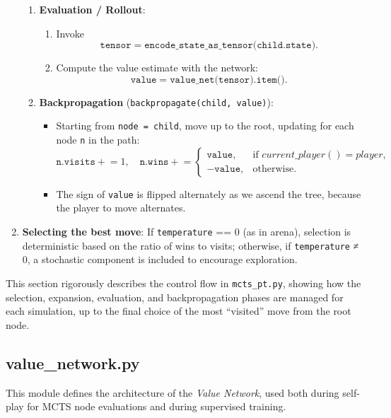 \documentclass{report}
\begin{document}
\begin{enumerate}
\begin{enumerate}
      \item \textbf{Evaluation / Rollout}:
            \begin{enumerate}
              \item Invoke  
                \[
                  \texttt{tensor} = \texttt{encode\_state\_as\_tensor(child.state)}.
                \]
             \item Compute the value estimate with the network:
                \[
                  \texttt{value} = \texttt{value\_net(tensor).item()}.
                \]
            \end{enumerate}

      \item \textbf{Backpropagation} (\texttt{backpropagate(child, value)}):
        \begin{itemize}
          \item Starting from \texttt{node = child}, move up to the root, updating for each node \texttt{n} in the path:
            \[
              \texttt{n.visits} \mathrel{+}= 1,
              \quad
              \texttt{n.wins} \mathrel{+}= 
              \begin{cases}
                \texttt{value}, & \text{if } current\_player() = player,\\
                -\texttt{value}, & \text{otherwise}.
              \end{cases}
            \]
          \item The sign of \texttt{value} is flipped alternately as we ascend the tree, because the player to move alternates.
        \end{itemize}
    \end{enumerate}

  \item \textbf{Selecting the best move}:
      If \texttt{temperature} == 0 (as in arena), selection is deterministic based on the ratio of wins to visits; otherwise, if \texttt{temperature} ≠ 0, a stochastic component is included to encourage exploration.
\end{enumerate}

This section rigorously describes the control flow in \texttt{mcts\_pt.py}, showing how the selection, expansion, evaluation, and backpropagation phases are managed for each simulation, up to the final choice of the most “visited” move from the root node.

\subsection{value\_network.py}
\label{sec:value_network}
This module defines the architecture of the \textit{Value Network}, used both during self-play for MCTS node evaluations and during supervised training.
\end{document}
